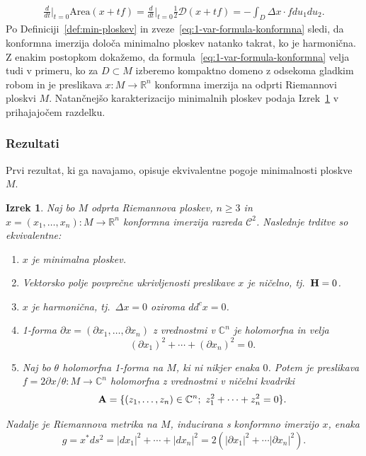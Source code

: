 \documentclass[12pt,a4paper,twoside]{article}
\theoremstyle{definition} %
\theoremstyle{plain} %
\newtheorem{izrek}[definicija]{Izrek}
\numberwithin{equation}{section}  %
\newcommand{\R}{\mathbb R}
\newcommand{\C}{\mathbb C}
\begin{document}
\begin{gather} \label{eq:1-var-formula-konformna}
\frac{d}{dt} \Big|_{t=0} \text{Area}(x+tf) = \frac{d}{dt} \Big|_{t=0} \frac{1}{2} \mathcal{D}(x+tf) = - \int_{D} \Delta{x} \cdot f du_1 du_2.
\end{gather}
Po Definiciji~\ref{def:min-ploskev} in zveze~\eqref{eq:1-var-formula-konformna} sledi, da konformna imerzija določa minimalno ploskev natanko takrat, ko je harmonična. 
Z enakim postopkom dokažemo, da formula~\eqref{eq:1-var-formula-konformna} velja tudi v primeru, ko za $D \subset M$ izberemo kompaktno domeno z odsekoma gladkim robom in je preslikava $x \colon M \to \R^{n}$ konformna imerzija na odprti Riemannovi ploskvi $M$.
Natančnejšo karakterizacijo minimalnih ploskev podaja Izrek~\ref{izr:ekviv-min-ploskev} v prihajajočem razdelku.

\subsubsection{Rezultati}
%
Prvi rezultat, ki ga navajamo, opisuje ekvivalentne pogoje minimalnosti ploskve $M$.

\begin{izrek} \label{izr:ekviv-min-ploskev}
Naj bo $M$ odprta Riemannova ploskev, $n \geq 3$ in $x = (x_1, \dots , x_n) \colon M \to \R^{n}$ konformna imerzija razreda $\mathcal{C}^2$. Naslednje trditve so ekvivalentne:
\begin{enumerate}
	\item $x$ je minimalna ploskev.
	\item Vektorsko polje povprečne ukrivljenosti preslikave $x$ je ničelno, tj.~$\textbf{\textup{H}} = 0$.
	\item $x$ je harmonična, tj.~$\Delta{x} = 0$ oziroma $dd^{c}x = 0$.
	\item 1-forma $ \partial{x} = (\partial{x_1}, \dots , \partial{x_n})$ z vrednostmi v $\C^{n}$ je holomorfna in velja
			\begin{equation} \label{eq:partialx^2 = 0}
			(\partial{x_1})^2 + \cdots + (\partial{x_n})^2 = 0.
			\end{equation}
	\item Naj bo $\theta$ holomorfna 1-forma na $M$, ki ni nikjer enaka $0$. Potem je preslikava $f = 2\partial{x} / \theta \colon M \to \C^{n}$ holomorfna z 				vrednostmi v ničelni kvadriki
			\begin{equation} \label{ničelna-kvadrika}		
			\textbf{\textup{A}} = \{ (z_1, \dots , z_n) \in \C^{n} ; \ z_{1}^{2} + \cdots + z_{n}^{2} = 0 \}.
			\end{equation}	
\end{enumerate}
Nadalje je Riemannova metrika na $M$, inducirana s konformno imerzijo $x$, enaka
	\begin{equation} \label{eq:|dx|^2=2|partialx|^2}
	g = x^{*} ds^2 = |dx_1|^2 + \cdots + |dx_n|^2 = 2 (|\partial{x_1}|^2 + \cdots |\partial{x_n}|^2).
	\end{equation}			
\end{izrek}
\end{document}
